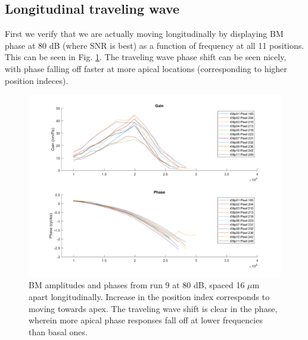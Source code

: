 \documentclass{article}
\begin{document}
\subsection{Longitudinal traveling wave}
\par{First we verify that we are actually moving longitudinally by displaying BM phase at 80 dB (where SNR is best) as a function of frequency at all 11 positions. This can be seen in Fig. \ref{long}. The traveling wave phase shift can be seen nicely, with phase falling off faster at more apical locations (corresponding to higher position indeces).}

\begin{figure}
	\centering
	\includegraphics[width=.8\textwidth]{Figures/longshift.png}
	\caption{BM amplitudes and phases from run 9 at 80 dB, spaced 16 $\mu$m apart longitudinally. Increase in the position index corresponds to moving towards apex. The traveling wave shift is clear in the phase, wherein more apical phase responses fall off at lower frequencies than basal ones.}
	\label{long}
\end{figure}
\end{document}

